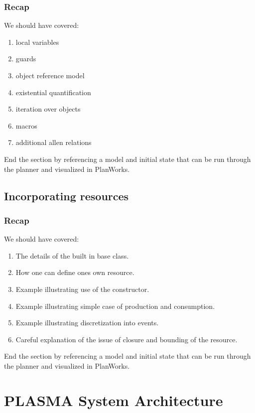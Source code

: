 \documentclass[10pt, letterpaper, twoside]{article}
\begin{document}
{\subsubsection{Recap}
We should have covered:
\begin{enumerate}
\item local variables
\item guards
\item object reference model
\item existential quantification
\item iteration over objects
\item macros
\item additional allen relations
\end{enumerate}
End the section by referencing a model and initial state that can be
run through the planner and visualized in PlanWorks.

\subsection{Incorporating resources}
\subsubsection{Recap}
We should have covered:
\begin{enumerate}
\item The details of the built in base class. 
\item How one can define ones own resource.
\item Example illustrating use of the constructor.
\item Example illustrating simple case of production and consumption.
\item Example illustrating discretization into events.
\item Careful explanation of the issue of closure and bounding of the resource.
\end{enumerate}
End the section by referencing a model and initial state that can be
run through the planner and visualized in PlanWorks.

\section{PLASMA System Architecture}

}
\end{document}
